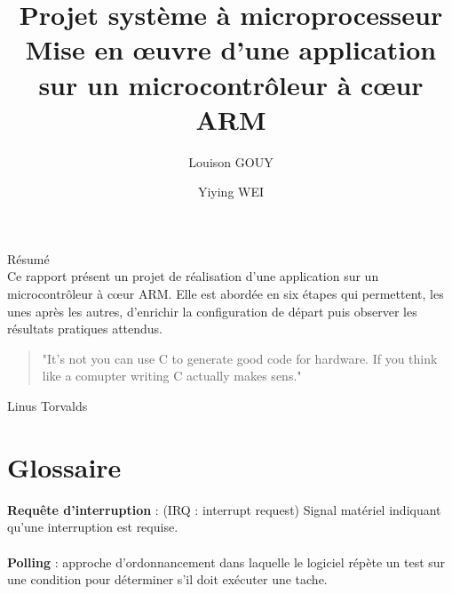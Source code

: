 \documentclass[a4paper]{article}
\title{\textbf{Projet système à microprocesseur} \\
	 Mise en œuvre d'une application sur un microcontrôleur à cœur ARM}
\author{Louison GOUY \and Yiying WEI}
\begin{document}
\maketitle

\vspace{2cm}

\begin{center}
\end{center}

\vspace*{1cm}



\vspace*{7cm}

\begin{center}

Résumé\\
 Ce rapport présent un projet de réalisation d'une application sur un microcontrôleur à cœur ARM. Elle est abordée en six étapes qui permettent, les unes après les autres, d'enrichir la configuration de départ puis observer les résultats pratiques attendus.

\end{center}

\newpage
\vspace*{3cm}
\begin{quotation}
	"It's not you can use C to generate good code for hardware. If you think like a comupter writing C actually makes sens."
\end{quotation}
\begin{flushright}
	Linus Torvalds
\end{flushright} 
\newpage


\newpage
\renewcommand{\contentsname}{Table des Matières}
\tableofcontents
\newpage
\renewcommand\listfigurename{Liste des figures}
\listoffigures
\newpage

\section{Glossaire}

\textbf{Requête d'interruption} : (IRQ : interrupt request) Signal matériel indiquant qu'une interruption est requise. \\ ~ \\

\textbf{Polling} : approche d'ordonnancement dans laquelle le logiciel répète un test sur une condition pour déterminer s'il doit exécuter une tache.\cite{ARM_book} \\ ~ \\
\end{document}
